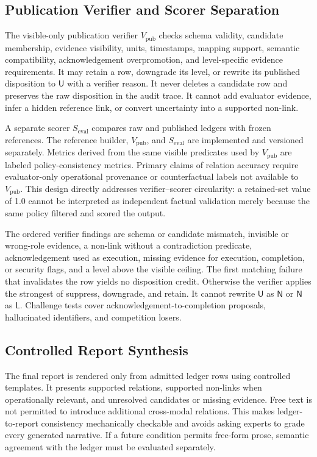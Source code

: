 \documentclass[conference]{IEEEtran}
\begin{document}
\subsection{Publication Verifier and Scorer Separation}

The visible-only publication verifier $V_{\mathrm{pub}}$ checks schema validity, candidate membership, evidence visibility, units, timestamps, mapping support, semantic compatibility, acknowledgement overpromotion, and level-specific evidence requirements. It may retain a row, downgrade its level, or rewrite its published disposition to $\mathsf{U}$ with a verifier reason. It never deletes a candidate row and preserves the raw disposition in the audit trace. It cannot add evaluator evidence, infer a hidden reference link, or convert uncertainty into a supported non-link.

A separate scorer $S_{\mathrm{eval}}$ compares raw and published ledgers with frozen references. The reference builder, $V_{\mathrm{pub}}$, and $S_{\mathrm{eval}}$ are implemented and versioned separately. Metrics derived from the same visible predicates used by $V_{\mathrm{pub}}$ are labeled policy-consistency metrics. Primary claims of relation accuracy require evaluator-only operational provenance or counterfactual labels not available to $V_{\mathrm{pub}}$. This design directly addresses verifier--scorer circularity: a retained-set value of 1.0 cannot be interpreted as independent factual validation merely because the same policy filtered and scored the output.

The ordered verifier findings are schema or candidate mismatch, invisible or wrong-role evidence, a non-link without a contradiction predicate, acknowledgement used as execution, missing evidence for execution, completion, or security flags, and a level above the visible ceiling. The first matching failure that invalidates the row yields no disposition credit. Otherwise the verifier applies the strongest of suppress, downgrade, and retain. It cannot rewrite $\mathsf{U}$ as $\mathsf{N}$ or $\mathsf{N}$ as $\mathsf{L}$. Challenge tests cover acknowledgement-to-completion proposals, hallucinated identifiers, and competition losers.

\subsection{Controlled Report Synthesis}

The final report is rendered only from admitted ledger rows using controlled templates. It presents supported relations, supported non-links when operationally relevant, and unresolved candidates or missing evidence. Free text is not permitted to introduce additional cross-modal relations. This makes ledger-to-report consistency mechanically checkable and avoids asking experts to grade every generated narrative. If a future condition permits free-form prose, semantic agreement with the ledger must be evaluated separately.
\end{document}
